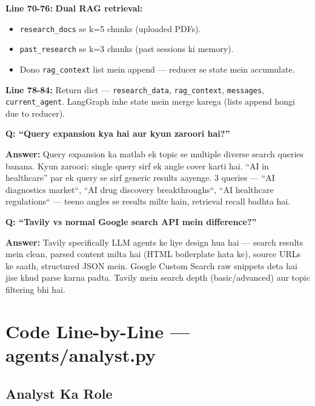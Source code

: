 \documentclass[11pt, a4paper]{article}
\begin{document}
\begin{codestorybox}
\textbf{Line 70-76:} \textbf{Dual RAG retrieval:}
\begin{itemize}
\item \texttt{research\_docs} se k=5 chunks (uploaded PDFs).
\item \texttt{past\_research} se k=3 chunks (past sessions ki memory).
\item Dono \texttt{rag\_context} list mein append --- reducer se state mein accumulate.
\end{itemize}

\textbf{Line 78-84:} Return dict --- \texttt{research\_data}, \texttt{rag\_context}, \texttt{messages}, \texttt{current\_agent}. LangGraph inhe state mein merge karega (lists append hongi due to reducer).
\end{codestorybox}

\begin{interviewbox}
\textbf{Q: ``Query expansion kya hai aur kyun zaroori hai?''}

\textbf{Answer:} Query expansion ka matlab ek topic se multiple diverse search queries banana. Kyun zaroori: single query sirf ek angle cover karti hai. ``AI in healthcare'' par ek query se sirf generic results aayenge. 3 queries --- ``AI diagnostics market``, ``AI drug discovery breakthroughs``, ``AI healthcare regulations`` --- teeno angles se results milte hain, retrieval recall badhta hai.
\end{interviewbox}

\begin{interviewbox}
\textbf{Q: ``Tavily vs normal Google search API mein difference?''}

\textbf{Answer:} Tavily specifically LLM agents ke liye design hua hai --- search results mein clean, parsed content milta hai (HTML boilerplate hata ke), source URLs ke saath, structured JSON mein. Google Custom Search raw snippets deta hai jise khud parse karna padta. Tavily mein search depth (basic/advanced) aur topic filtering bhi hai.
\end{interviewbox}

\section{Code Line-by-Line --- agents/analyst.py}

\subsection{Analyst Ka Role}
\end{document}

